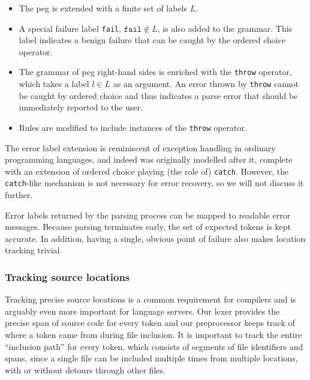 

\begin{itemize}
	\item The \acrlong{peg} is extended with a finite set of labels $L$.
	\item A special failure label \texttt{fail}, $\texttt{fail} \not \in L$, is
	also added to the grammar. This label indicates a benign failure that can be
	caught by the ordered choice operator.
	\item The grammar of \acrlong{peg} right-hand sides is enriched with the
	\texttt{throw} operator, which takes a label $l \in L$ as an argument. An
	error thrown by \texttt{throw} cannot be caught by ordered choice and thus
	indicates a parse error that should be immediately reported to the user.
	\item Rules are modified to include instances of the \texttt{throw}
	operator.
\end{itemize}

The error label extension is reminiscent of exception handling in ordinary
programming languages, and indeed was originally modelled after it, complete
with an extension of ordered choice playing (the role of)
\texttt{catch}\cite{demedeiros2016parsing}. However, the \texttt{catch}-like
mechanism is not necessary for error recovery, so we will not discuss it
further.

Error labels returned by the parsing process can be mapped to readable error
messages. Because parsing terminates early, the set of expected tokens is kept
accurate. In addition, having a single, obvious point of failure also makes
location tracking trivial.

\subsubsection*{Tracking source locations}

Tracking precise source locations is a common requirement for compilers and is
arguably even more important for language servers. Our lexer provides the
precise span of source code for every token and our preprocessor keeps track of
where a token came from during file inclusion. It is important to track the
entire ``inclusion path'' for every token, which consists of segments of file
identifiers and spans, since a single file can be included multiple times from
multiple locations, with or without detours through other files.


